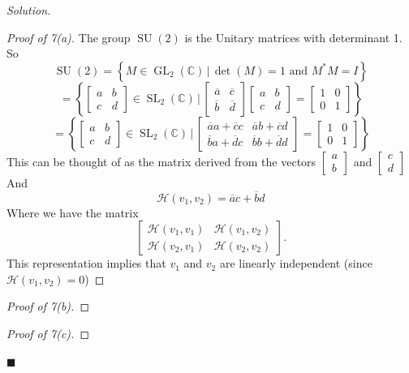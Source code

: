 \documentclass[11pt]{article}
\theoremstyle{plain}
\theoremstyle{definition}
\newenvironment{solution}{%
  \par\noindent\textit{Solution.}\
}{%
  \hfill$\blacksquare$\par\bigskip
}
\newcommand{\C}{\mathbb{C}}
\newcommand{\Herm}{\mathcal{H}}
\DeclareMathOperator{\SU}{SU}
\DeclareMathOperator{\GL}{GL}
\DeclareMathOperator{\SL}{SL}
\begin{document}
\begin{solution}
  \begin{proof}[Proof of 7(a)]
    The group \( \SU(2) \) is the Unitary matrices with determinant 1. So
    \[
      \SU(2)=\left\{M\in \GL_2(\C)\,|\,\det(M)=1 \text{ and } M^*M=I\right\}
    \]
    \[
      =\left\{
        \begin{bmatrix}a & b \\ c & d
        \end{bmatrix}\in \SL_2(\C)\,|\,
        \begin{bmatrix}
          \overline{a} &
          \overline{c} \\
          \overline{b} &
          \overline{d}
        \end{bmatrix}
        \begin{bmatrix}
          a & b \\ c & d
        \end{bmatrix}=
        \begin{bmatrix}
          1 & 0 \\
          0 & 1
        \end{bmatrix}
      \right\}
    \]
    \[
      =\left\{
        \begin{bmatrix}a & b \\ c & d
        \end{bmatrix}\in \SL_2(\C)\,|\,
        \begin{bmatrix}
          \overline{a}a + \overline{c}c & \overline{a}b +
          \overline{c}d \\ \overline{b}a + \overline{d}c &
          \overline{b}b + \overline{d}d
        \end{bmatrix}=
        \begin{bmatrix}
          1 & 0 \\
          0 & 1
        \end{bmatrix}
      \right\}
    \]
    This can be thought of as the matrix derived from the vectors
    \(
      \begin{bmatrix}
        a \\ b
    \end{bmatrix} \) and \(
      \begin{bmatrix}
        c \\ d
    \end{bmatrix} \)
    And
    \[
      \Herm\!\left(v_1,v_2\right) = \overline{a} c + \overline{b} d
    \]
    Where we have the matrix
    \[
      \begin{bmatrix}
        \Herm(v_1, v_1) & \Herm(v_1, v_2) \\
        \Herm(v_2, v_1) & \Herm(v_2, v_2)
      \end{bmatrix}.
    \]
    This representation implies that \( v_1 \) and \( v_2 \) are
    linearly independent (since \( \Herm(v_1,v_2)=0 \))
  \end{proof}

  \begin{proof}[Proof of 7(b)]
  \end{proof}

  \begin{proof}[Proof of 7(c)]
  \end{proof}
\end{solution}
\end{document}
